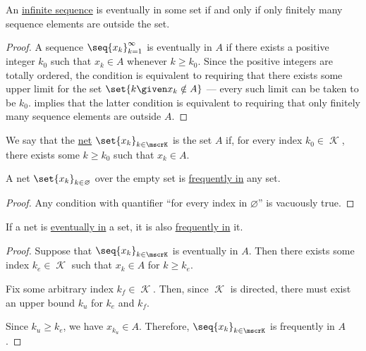 \begin{proposition}\label{thm:sequence_eventally_in}
  An \hyperref[def:sequence]{infinite sequence} is eventually in some set if and only if only finitely many sequence elements are outside the set.
\end{proposition}
\begin{proof}
  A sequence \( \seq{ x_k }_{k=1}^\infty \) is eventually in \( A \) if there exists a positive integer \( k_0 \) such that \( x_k \in A \) whenever \( k \geq k_0 \). Since the positive integers are totally ordered, the condition is equivalent to requiring that there exists some upper limit for the set \( \set{ k \given x_k \notin A } \) --- every such limit can be taken to be \( k_0 \).  implies that the latter condition is equivalent to requiring that only finitely many sequence elements are outside \( A \).
\end{proof}

\begin{definition}\label{def:net_frequently_in}
  We say that the \hyperref[def:topological_net]{net} \( \set{ x_k }_{k \in \mscrK} \) is  the set \( A \) if, for every index \( k_0 \in \mscrK \), there exists some \( k \geq k_0 \) such that \( x_k \in A \).
\end{definition}

\begin{proposition}\label{thm:empty_index_set_implies_frequently_in}
  A net \( \set{ x_k }_{k \in \varnothing} \) over the empty set is \hyperref[def:net_frequently_in]{frequently in} any set.
\end{proposition}
\begin{proof}
  Any condition with quantifier \enquote{for every index in \( \varnothing \)} is vacuously true.
\end{proof}

\begin{proposition}\label{thm:eventually_in_implies_frequently_in}
  If a net is \hyperref[def:net_eventually_in]{eventually in} a set, it is also \hyperref[def:net_frequently_in]{frequently in} it.
\end{proposition}
\begin{proof}
  Suppose that \( \seq{ x_k }_{k \in \mscrK} \) is eventually in \( A \). Then there exists some index \( k_e \in \mscrK \) such that \( x_k \in A \) for \( k \geq k_e \).

  Fix some arbitrary index \( k_f \in \mscrK \). Then, since \( \mscrK \) is directed, there must exist an upper bound \( k_u \) for \( k_e \) and \( k_f \).

  Since \( k_u \geq k_e \), we have \( x_{k_u} \in A \). Therefore, \( \seq{ x_k }_{k \in \mscrK} \) is frequently in \( A \).
\end{proof}

